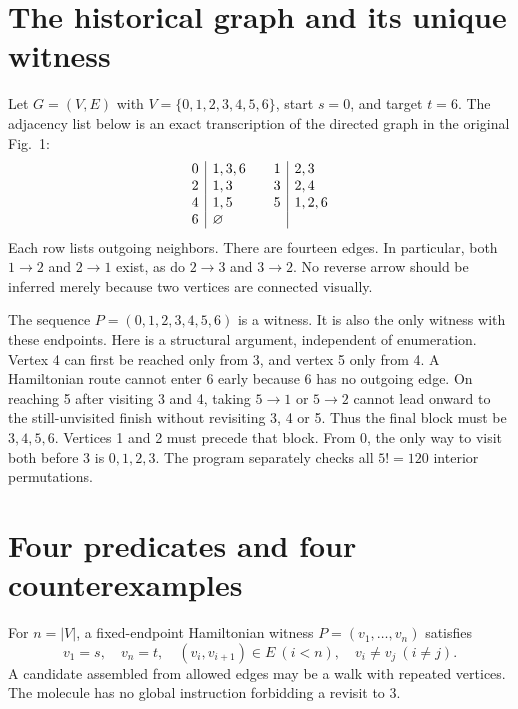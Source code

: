 \section{The historical graph and its unique witness}
Let $G=(V,E)$ with $V=\{0,1,2,3,4,5,6\}$, start $s=0$, and target $t=6$. The adjacency list below is an exact transcription of the directed graph in the original Fig.~1:
\[
\begin{array}{c|l@{\qquad}c|l}
0&1,3,6 & 1&2,3\\
2&1,3 & 3&2,4\\
4&1,5 & 5&1,2,6\\
6&\varnothing &&
\end{array}
\]
Each row lists outgoing neighbors. There are fourteen edges. In particular, both $1\to2$ and $2\to1$ exist, as do $2\to3$ and $3\to2$. No reverse arrow should be inferred merely because two vertices are connected visually.

The sequence $P=(0,1,2,3,4,5,6)$ is a witness. It is also the only witness with these endpoints. Here is a structural argument, independent of enumeration. Vertex 4 can first be reached only from 3, and vertex 5 only from 4. A Hamiltonian route cannot enter 6 early because 6 has no outgoing edge. On reaching 5 after visiting 3 and 4, taking $5\to1$ or $5\to2$ cannot lead onward to the still-unvisited finish without revisiting 3, 4 or 5. Thus the final block must be $3,4,5,6$. Vertices 1 and 2 must precede that block. From 0, the only way to visit both before 3 is $0,1,2,3$. The program separately checks all $5!=120$ interior permutations.

\section{Four predicates and four counterexamples}
For $n=|V|$, a fixed-endpoint Hamiltonian witness $P=(v_1,\ldots,v_n)$ satisfies
\begin{equation}
v_1=s,\quad v_n=t,\quad
(v_i,v_{i+1})\in E\ (i<n),\quad
v_i\ne v_j\ (i\ne j).
\label{eq:d2ham}
\end{equation}
A candidate assembled from allowed edges may be a walk with repeated vertices. The molecule has no global instruction forbidding a revisit to 3.

